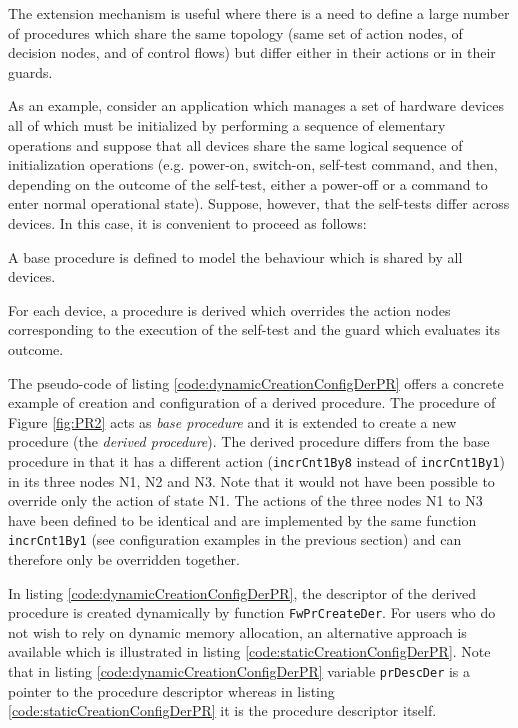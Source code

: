 \documentclass[manual]{../fwprofile}
\begin{document}
The extension mechanism is useful where there is a need to define a large number of procedures which share 
the same topology (same set of action nodes, of decision nodes, and of control flows) but differ either in their 
actions or in their guards.



As an example, consider an application which manages a set of hardware devices all of which must be
initialized by performing a sequence of elementary operations and suppose that all devices share the same
logical sequence of initialization operations (e.g. power-on, switch-on, self-test command, and then, depending
on the outcome of the self-test, either a power-off or a command to enter normal operational state). 
Suppose, however, that the self-tests differ across devices. 
In this case, it is convenient to proceed as follows:

\begin{fw_itemize}
\item A base procedure is defined to model the behaviour which is shared by all devices.
\item For each device, a procedure is derived which overrides the action nodes corresponding to the 
execution of the self-test and the guard which evaluates its outcome.
\end{fw_itemize}

The pseudo-code of listing \ref{code:dynamicCreationConfigDerPR} offers a concrete example of creation and 
configuration of a derived procedure. 
The procedure of Figure \ref{fig:PR2} acts as \emph{base procedure} and it is extended to create a new 
procedure (the \emph{derived procedure}). 
The derived procedure differs from the base procedure in that it has a different action
(\texttt{incrCnt1By8} instead of \texttt{incrCnt1By1}) in its three nodes N1, N2 and N3.
Note that it would not have been possible to override only the action of state N1. 
The actions of the three nodes N1 to N3 have been defined to be identical and are 
implemented by the same function \texttt{incrCnt1By1} (see configuration examples in the previous section) 
and can therefore only be overridden together. 

In listing \ref{code:dynamicCreationConfigDerPR}, the descriptor of the derived procedure is created dynamically by 
function \texttt{FwPrCreateDer}. For users who do not wish to rely on dynamic memory allocation, an alternative approach 
is available which is illustrated in listing \ref{code:staticCreationConfigDerPR}. 
Note that in listing \ref{code:dynamicCreationConfigDerPR} variable \texttt{prDescDer} is 
a pointer to the procedure descriptor whereas in listing \ref{code:staticCreationConfigDerPR} it is the procedure descriptor itself.
\end{document}
